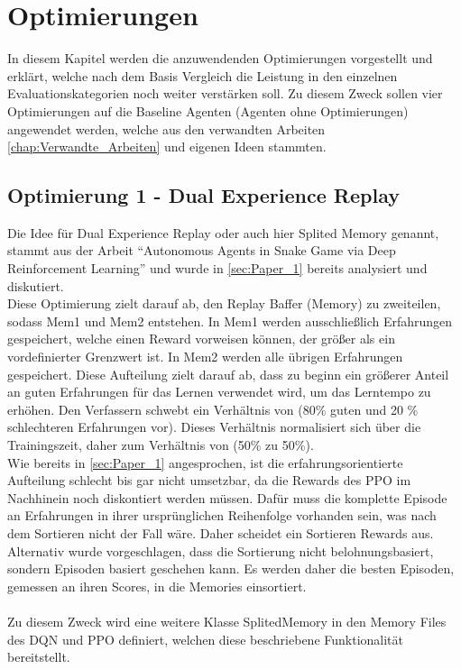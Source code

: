 \chapter{Optimierungen} \label{chap:Optimierungen}
In diesem Kapitel werden die anzuwendenden Optimierungen vorgestellt und erklärt, welche nach dem Basis Vergleich die Leistung in den einzelnen Evaluationskategorien noch weiter verstärken soll. Zu diesem Zweck sollen vier Optimierungen auf die Baseline Agenten (Agenten ohne Optimierungen) angewendet werden, welche aus den verwandten Arbeiten \ref{chap:Verwandte_Arbeiten} und eigenen Ideen stammten.

\section{Optimierung 1 - Dual Experience Replay}
Die Idee für Dual Experience Replay oder auch hier Splited Memory genannt, stammt aus der Arbeit "`Autonomous Agents in Snake Game via Deep Reinforcement Learning"' und wurde in \ref{sec:Paper_1} bereits analysiert und diskutiert.\\
Diese Optimierung zielt darauf ab, den Replay Baffer (Memory) zu zweiteilen, sodass Mem1 und Mem2 entstehen. In Mem1 werden ausschließlich Erfahrungen gespeichert, welche einen Reward vorweisen können, der größer als ein vordefinierter Grenzwert ist. In Mem2 werden alle übrigen Erfahrungen gespeichert. Diese Aufteilung zielt darauf ab, dass zu beginn ein größerer Anteil an guten Erfahrungen für das Lernen verwendet wird, um das Lerntempo zu erhöhen. Den Verfassern schwebt ein Verhältnis von (80\% guten und 20 \% schlechteren Erfahrungen vor). Dieses Verhältnis normalisiert sich über die Trainingszeit, daher zum Verhältnis von (50\% zu 50\%).\\
Wie bereits in \ref{sec:Paper_1} angesprochen, ist die erfahrungsorientierte Aufteilung schlecht bis gar nicht umsetzbar, da die Rewards des PPO im Nachhinein noch diskontiert werden müssen. Dafür muss die komplette Episode an Erfahrungen in ihrer ursprünglichen Reihenfolge vorhanden sein, was nach dem Sortieren nicht der Fall wäre. Daher scheidet ein Sortieren Rewards aus.\\
Alternativ wurde vorgeschlagen, dass die Sortierung nicht belohnungsbasiert, sondern Episoden basiert geschehen kann. Es werden daher die besten Episoden, gemessen an ihren Scores, in die Memories einsortiert.\\
\\ Zu diesem Zweck wird eine weitere Klasse SplitedMemory in den Memory Files des DQN und PPO definiert, welchen diese beschriebene Funktionalität bereitstellt.